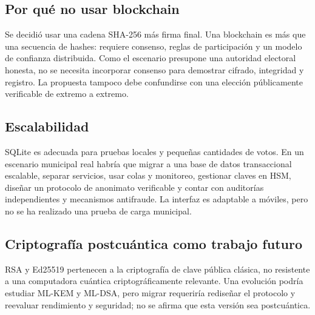 \subsection{Por qué no usar blockchain}
Se decidió usar una cadena SHA-256 más firma final. Una blockchain es más que una secuencia de hashes: requiere consenso, reglas de participación y un modelo de confianza distribuida. Como el escenario presupone una autoridad electoral honesta, no se necesita incorporar consenso para demostrar cifrado, integridad y registro. La propuesta tampoco debe confundirse con una elección públicamente verificable de extremo a extremo.

\subsection{Escalabilidad}
SQLite es adecuada para pruebas locales y pequeñas cantidades de votos. En un escenario municipal real habría que migrar a una base de datos transaccional escalable, separar servicios, usar colas y monitoreo, gestionar claves en HSM, diseñar un protocolo de anonimato verificable y contar con auditorías independientes y mecanismos antifraude. La interfaz es adaptable a móviles, pero no se ha realizado una prueba de carga municipal.

\subsection{Criptografía postcuántica como trabajo futuro}
RSA y Ed25519 pertenecen a la criptografía de clave pública clásica, no resistente a una computadora cuántica criptográficamente relevante. Una evolución podría estudiar ML-KEM y ML-DSA, pero migrar requeriría rediseñar el protocolo y reevaluar rendimiento y seguridad; no se afirma que esta versión sea postcuántica.
